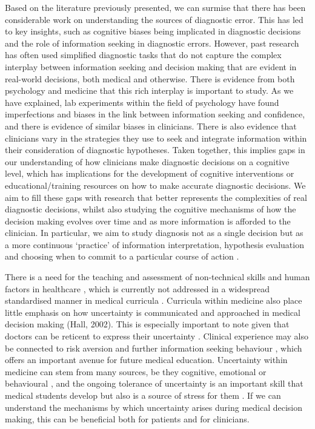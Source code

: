 \documentclass[a4paper, nobind]{templates/ociamthesis}
\begin{document}
Based on the literature previously presented, we can surmise that there has been considerable work on understanding the sources of diagnostic error. This has led to key insights, such as cognitive biases being implicated in diagnostic decisions and the role of information seeking in diagnostic errors. However, past research has often used simplified diagnostic tasks that do not capture the complex interplay between information seeking and decision making that are evident in real-world decisions, both medical and otherwise. There is evidence from both psychology and medicine that this rich interplay is important to study. As we have explained, lab experiments within the field of psychology have found imperfections and biases in the link between information seeking and confidence, and there is evidence of similar biases in clinicians. There is also evidence that clinicians vary in the strategies they use to seek and integrate information within their consideration of diagnostic hypotheses. Taken together, this implies gaps in our understanding of how clinicians make diagnostic decisions on a cognitive level, which has implications for the development of cognitive interventions or educational/training resources on how to make accurate diagnostic decisions. We aim to fill these gaps with research that better represents the complexities of real diagnostic decisions, whilst also studying the cognitive mechanisms of how the decision making evolves over time and as more information is afforded to the clinician. In particular, we aim to study diagnosis not as a single decision but as a more continuous `practice' of information interpretation, hypothesis evaluation and choosing when to commit to a particular course of action \autocite{alby_diagnostic_2015}.

\hfill\break
There is a need for the teaching and assessment of non-technical skills and human factors in healthcare \autocite{higham_observer-based_2019}, which is currently not addressed in a widespread standardised manner in medical curricula \autocite{greig_lack_2015}. Curricula within medicine also place little emphasis on how uncertainty is communicated and approached in medical decision making (Hall, 2002). This is especially important to note given that doctors can be reticent to express their uncertainty \autocite{katz_why_1984}. Clinical experience may also be connected to risk aversion and further information seeking behaviour \autocite{lawton_are_2019}, which offers an important avenue for future medical education. Uncertainty within medicine can stem from many sources, be they cognitive, emotional or behavioural \autocite{han_varieties_2011,lee_towards_2021}, and the ongoing tolerance of uncertainty is an important skill that medical students develop but also is a source of stress for them \autocite{hancock_tolerance_2020,stephens_exploring_2021}. If we can understand the mechanisms by which uncertainty arises during medical decision making, this can be beneficial both for patients and for clinicians.
\end{document}

